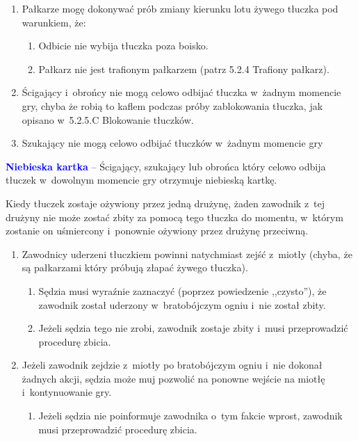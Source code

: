 \documentclass[12pt,a4paper]{article}
\renewcommand{\subsubsection}[1]{
  \oldsubsubsection{#1}%
  \leftskip1.3cm
}
\newcommand\bluecard[1]{\bgroup\textcolor{blue}{\textbf{#1}}}
\begin{document}
\begin{enumerate}
	\item
	      Pałkarze mogę dokonywać prób zmiany kierunku lotu żywego tłuczka pod
	      warunkiem, że:

	      \begin{enumerate}
		      \item
		            Odbicie nie wybija tłuczka poza boisko.
		      \item
		            Pałkarz nie jest trafionym pałkarzem (patrz 5.2.4 Trafiony pałkarz).
	      \end{enumerate}
	\item
	      Ścigający i~obrońcy nie mogą celowo odbijać tłuczka w~żadnym momencie
	      gry, chyba że robią to kaflem podczas próby zablokowania tłuczka, jak
	      opisano w~5.2.5.C Blokowanie tłuczków.
	\item
	      Szukający nie mogą celowo odbijać tłuczków w~żadnym momencie gry
\end{enumerate}

\bluecard{Niebieska kartka} -- Ścigający, szukający lub obrońca który celowo
odbija tłuczek w~dowolnym momencie gry otrzymuje niebieską kartkę.

\subsubsection{Bratobójczy ogień}

Kiedy tłuczek zostaje ożywiony przez jedną drużynę, żaden zawodnik z~tej
drużyny nie może zostać zbity za pomocą tego tłuczka do momentu, w~którym zostanie on uśmiercony i~ponownie ożywiony przez drużynę
przeciwną.

\begin{enumerate}
	\item
	      Zawodnicy uderzeni tłuczkiem powinni natychmiast zejść z~miotły
	      (chyba, że są pałkarzami który próbują złapać żywego tłuczka).

	      \begin{enumerate}
		      \item
		            Sędzia musi wyraźnie zaznaczyć (poprzez powiedzenie ,,czysto''), że
		            zawodnik został uderzony w~bratobójczym ogniu i~nie został zbity.
		      \item
		            Jeżeli sędzia tego nie zrobi, zawodnik zostaje zbity i~musi
		            przeprowadzić procedurę zbicia.
	      \end{enumerate}
	\item
	      Jeżeli zawodnik zejdzie z~miotły po bratobójczym ogniu i~nie dokonał
	      żadnych akcji, sędzia może muj pozwolić na ponowne wejście na miotłę i~kontynuowanie gry.

	      \begin{enumerate}
		      \item
		            Jeżeli sędzia nie poinformuje zawodnika o~tym fakcie wprost,
		            zawodnik musi przeprowadzić procedurę zbicia.
	      \end{enumerate}
\end{enumerate}
\end{document}
